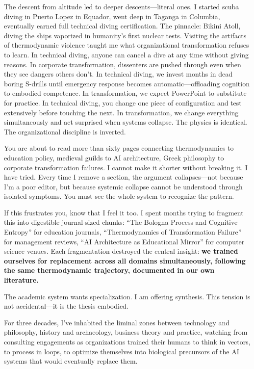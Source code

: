 The descent from altitude led to deeper descents---literal ones. I started scuba diving in Puerto Lopez in Equador, went deep in Taganga in Columbia, eventually earned full technical diving certification. The pinnacle: Bikini Atoll, diving the ships vaporized in humanity's first nuclear tests. Visiting the artifacts of thermodynamic violence taught me what organizational transformation refuses to learn. In technical diving, anyone can cancel a dive at any time without giving reasons. In corporate transformation, dissenters are pushed through even when they see dangers others don't. In technical diving, we invest months in dead boring S-drills until emergency response becomes automatic---offloading cognition to embodied competence. In transformation, we expect PowerPoint to substitute for practice. In technical diving, you change one piece of configuration and test extensively before touching the next. In transformation, we change everything simultaneously and act surprised when systems collapse. The physics is identical. The organizational discipline is inverted.

You are about to read more than sixty pages connecting thermodynamics to education policy, medieval guilds to AI architecture, Greek philosophy to corporate transformation failures. I cannot make it shorter without breaking it. I have tried. Every time I remove a section, the argument collapses---not because I'm a poor editor, but because systemic collapse cannot be understood through isolated symptoms. You must see the whole system to recognize the pattern.

If this frustrates you, know that I feel it too. I spent months trying to fragment this into digestible journal-sized chunks: ``The Bologna Process and Cognitive Entropy'' for education journals, ``Thermodynamics of Transformation Failure'' for management reviews, ``AI Architecture as Educational Mirror'' for computer science venues. Each fragmentation destroyed the central insight: \textbf{we trained ourselves for replacement across all domains simultaneously, following the same thermodynamic trajectory, documented in our own literature.}

The academic system wants specialization. I am offering synthesis. This tension is not accidental---it is the thesis embodied.

For three decades, I've inhabited the liminal zones between technology and philosophy, history and archaeology, business theory and practice, watching from consulting engagements as organizations trained their humans to think in vectors, to process in loops, to optimize themselves into biological precursors of the AI systems that would eventually replace them.

